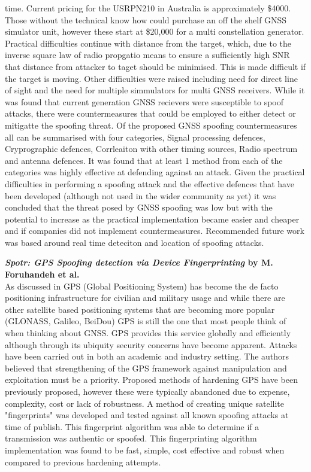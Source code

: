 time. Current pricing for the USRPN210 in Australia is approximately \$4000. 
Those without the technical know how could purchase an off the shelf GNSS simulator unit, however these start at \$20,000 for a multi constellation generator. Practical
difficulties continue with distance from the target, which, due to the inverse square law of radio propgatio means to ensure a sufficiently high SNR that distance from
attacker to taget should be minimised. This is made difficult if the target is moving. Other difficulties were raised including need for direct line of sight and the need for
multiple simmulators for multi GNSS receivers. 
While it was found that current generation GNSS recievers were susceptible to spoof attacks, there were countermeasures that could be employed to either detect or
mitigatte the spoofing threat. Of the proposed GNSS spoofing countermeasures all can be summarised with four categories, Signal processing defences, Cryprographic
defences, Corrleaiton with other timing sources, Radio spectrum and antenna defences. It was found that at least 1 method from each of the categories was highly effective
at defending against an attack. Given the practical difficulties in performing a spoofing attack and the effective defences that have been developed (although not used in
the wider community as yet) it was concluded that the threat posed by GNSS spoofing was low but with the potential to increase as the practical implementation became
easier and cheaper and if companies did not implement countermeasures.
Recommended future work was based around real time deteciton and location of spoofing attacks.

\medskip

\textbf{\emph{Spotr: GPS Spoofing detection via Device Fingerprinting} by M. Foruhandeh et al.}\\
As discussed in \cite{RN7} GPS (Global Positioning System) has become the de facto positioning infrastructure for civilian and military usage and while there are other
satellite based positioning systems that are becoming more popular (GLONASS, Galileo, BeiDou) GPS is still the one that most people think of when thinking about GNSS. GPS
provides this service globally and efficiently although through its ubiquity security concerns have become apparent. Attacks have been carried out in both an academic and
industry setting. The authors believed that strengthening of the GPS framework against manipulation and exploitation must be a priority. Proposed methods of hardening GPS
have been previously proposed, however these were typically abandoned due to expense, complexity, cost or lack of robustness. A method of creating unique satellite
"fingerprints" was developed and tested against all known spoofing attacks at time of publish. This fingerprint algorithm was able to determine if a transmission was
authentic or spoofed. This fingerprinting algorithm implementation was found to be fast, simple, cost effective and robust when compared to previous hardening attempts.

